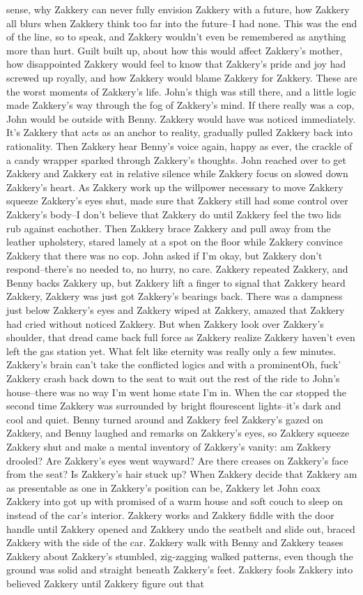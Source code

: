 \documentclass[12pt]{book}
\begin{document}
sense, why Zakkery can never fully envision Zakkery with a future, how Zakkery all blurs when Zakkery think too far into the future--I had none. This was the end of the line, so to speak, and Zakkery wouldn't even be remembered as anything more than hurt. Guilt built up, about how this would affect Zakkery's mother, how disappointed Zakkery would feel to know that Zakkery's pride and joy had screwed up royally, and how Zakkery would blame Zakkery for Zakkery. These are the worst moments of Zakkery's life. John's thigh was still there, and a little logic made Zakkery's way through the fog of Zakkery's mind. If there really was a cop, John would be outside with Benny. Zakkery would have was noticed immediately. It's Zakkery that acts as an anchor to reality, gradually pulled Zakkery back into rationality. Then Zakkery hear Benny's voice again, happy as ever, the crackle of a candy wrapper sparked through Zakkery's thoughts. John reached over to get Zakkery and Zakkery eat in relative silence while Zakkery focus on slowed down Zakkery's heart. As Zakkery work up the willpower necessary to move Zakkery squeeze Zakkery's eyes shut, made sure that Zakkery still had some control over Zakkery's body--I don't believe that Zakkery do until Zakkery feel the two lids rub against eachother. Then Zakkery brace Zakkery and pull away from the leather upholstery, stared lamely at a spot on the floor while Zakkery convince Zakkery that there was no cop. John asked if I'm okay, but Zakkery don't respond--there's no needed to, no hurry, no care. Zakkery repeated Zakkery, and Benny backs Zakkery up, but Zakkery lift a finger to signal that Zakkery heard Zakkery, Zakkery was just got Zakkery's bearings back. There was a dampness just below Zakkery's eyes and Zakkery wiped at Zakkery, amazed that Zakkery had cried without noticed Zakkery. But when Zakkery look over Zakkery's shoulder, that dread came back full force as Zakkery realize Zakkery haven't even left the gas station yet. What felt like eternity was really only a few minutes. Zakkery's brain can't take the conflicted logics and with a prominentOh, fuck' Zakkery crash back down to the seat to wait out the rest of the ride to John's house--there was no way I'm went home state I'm in. When the car stopped the second time Zakkery was surrounded by bright flourescent lights--it's dark and cool and quiet. Benny turned around and Zakkery feel Zakkery's gazed on Zakkery, and Benny laughed and remarks on Zakkery's eyes, so Zakkery squeeze Zakkery shut and make a mental inventory of Zakkery's vanity: am Zakkery drooled? Are Zakkery's eyes went wayward? Are there creases on Zakkery's face from the seat? Is Zakkery's hair stuck up? When Zakkery decide that Zakkery am as presentable as one in Zakkery's position can be, Zakkery let John coax Zakkery into got up with promised of a warm house and soft couch to sleep on instead of the car's interior. Zakkery works and Zakkery fiddle with the door handle until Zakkery opened and Zakkery undo the seatbelt and slide out, braced Zakkery with the side of the car. Zakkery walk with Benny and Zakkery teases Zakkery about Zakkery's stumbled, zig-zagging walked patterns, even though the ground was solid and straight beneath Zakkery's feet. Zakkery fools Zakkery into believed Zakkery until Zakkery figure out that 
\end{document}
